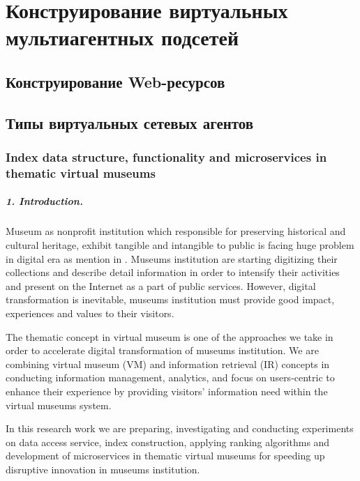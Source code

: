 \chapter{Конструирование виртуальных мультиагентных подсетей}\label{ch:ch4}

\section{Конструирование Web-ресурсов}\label{sec:ch4/sect1}

\section{Типы виртуальных сетевых агентов}\label{sec:ch4/sect2}

\subsection{Index data structure, functionality and microservices in thematic virtual museums}\label{subsec:ch4/sec2/sub1}

\paragraph{1. Introduction.} Museum as nonprofit institution which responsible for preserving historical and cultural heritage, exhibit tangible and intangible to public is facing huge problem in digital era as mention in \cite{AnggaiBlekanovSergeev2014}. Museums institution are starting digitizing their collections and describe detail information in order to intensify their activities and present on the Internet as a part of public services. However, digital transformation is inevitable, museums institution must provide good impact, experiences and values to their visitors.

The thematic concept in virtual museum is one of the approaches we take in order to accelerate digital transformation of museums institution. We are combining virtual museum (VM) and information retrieval (IR) concepts in conducting information management, analytics, and focus on users-centric to enhance their experience by providing visitors’ information need within the virtual museums system.

In this research work we are preparing, investigating and conducting experiments on data access service, index construction, applying ranking algorithms and development of microservices in thematic virtual museums for speeding up disruptive innovation in museums institution.

